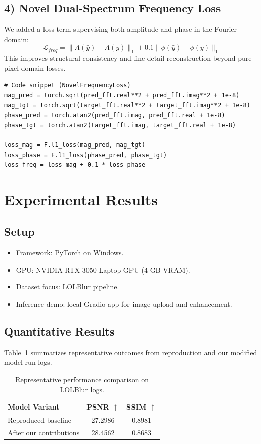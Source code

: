\documentclass[10pt,twocolumn]{article}
\begin{document}
\subsection{4) Novel Dual-Spectrum Frequency Loss}
We added a loss term supervising both amplitude and phase in the Fourier domain:
\begin{equation}
\mathcal{L}_{freq} = \|A(\hat{y}) - A(y)\|_1 + 0.1\|\phi(\hat{y}) - \phi(y)\|_1
\end{equation}
This improves structural consistency and fine-detail reconstruction beyond pure pixel-domain losses.
\begin{lstlisting}
# Code snippet (NovelFrequencyLoss)
mag_pred = torch.sqrt(pred_fft.real**2 + pred_fft.imag**2 + 1e-8)
mag_tgt = torch.sqrt(target_fft.real**2 + target_fft.imag**2 + 1e-8)
phase_pred = torch.atan2(pred_fft.imag, pred_fft.real + 1e-8)
phase_tgt = torch.atan2(target_fft.imag, target_fft.real + 1e-8)

loss_mag = F.l1_loss(mag_pred, mag_tgt)
loss_phase = F.l1_loss(phase_pred, phase_tgt)
loss_freq = loss_mag + 0.1 * loss_phase
\end{lstlisting}

\section{Experimental Results}

\subsection{Setup}
\begin{itemize}
  \item Framework: PyTorch on Windows.
  \item GPU: NVIDIA RTX 3050 Laptop GPU (4 GB VRAM).
  \item Dataset focus: LOLBlur pipeline.
  \item Inference demo: local Gradio app for image upload and enhancement.
\end{itemize}

\subsection{Quantitative Results}
Table~\ref{tab:results} summarizes representative outcomes from reproduction and our modified model run logs.

\begin{table}[H]
\centering
\caption{Representative performance comparison on LOLBlur logs.}
\label{tab:results}
\begin{tabular}{lcc}
\toprule
Model Variant & PSNR $\uparrow$ & SSIM $\uparrow$ \\
\midrule
Reproduced baseline & 27.2986 & 0.8981 \\
After our contributions & 28.4562 & 0.8683 \\
\bottomrule
\end{tabular}
\end{table}
\end{document}
